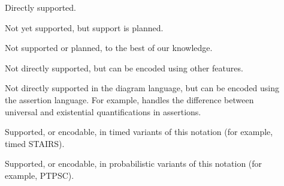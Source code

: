 \begin{description}
\item[\OK] Directly supported.
\item[\SOON] Not yet supported, but
  support is planned.
\item[\NO] Not supported or planned, to the best of our knowledge.
\item[\ISH] Not directly supported, but can be encoded using other
  features.
\item[\ASST] Not directly supported in the
  diagram language, but can be encoded using the
  assertion language.  For example, \langname{} handles
  the difference between universal and existential
  quantifications in assertions.
\item[\INTIMED] Supported, or encodable, in timed variants of this
  notation (for example, timed STAIRS).
\item[\INPROB] Supported, or encodable, in
  probabilistic variants of this
  notation (for example, PTPSC).
\end{description}

